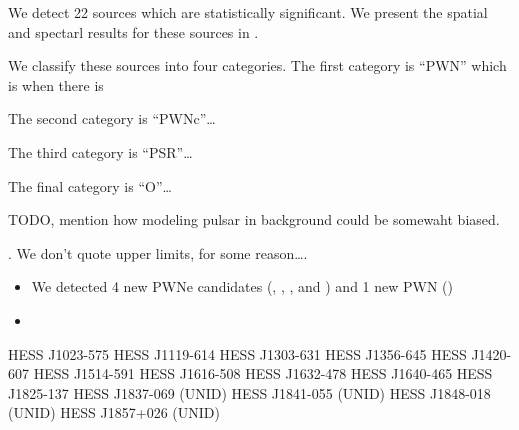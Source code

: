 We detect 22 sources which are statistically significant. We
present the spatial and spectarl results for these sources in
.

We classify these sources into four categories.
The first category is ``PWN'' which is when there is 

The second category is ``PWNc''\ldots

The third category is ``PSR''\ldots

The final category is ``O''\ldots

TODO, mention how modeling pulsar in background could be somewaht biased.

. We don't quote upper limits, for some reason\ldots.




\begin{itemize}
  \item
    We detected 4 new PWNe candidates (, ,
    ,
    and )
    and 1 new PWN ()
  \item
\end{itemize}



HESS J1023-575
HESS J1119-614
HESS J1303-631
HESS J1356-645
HESS J1420-607
HESS J1514-591
HESS J1616-508
HESS J1632-478
HESS J1640-465
HESS J1825-137
HESS J1837-069 (UNID)
HESS J1841-055 (UNID)
HESS J1848-018 (UNID)
HESS J1857+026 (UNID)



